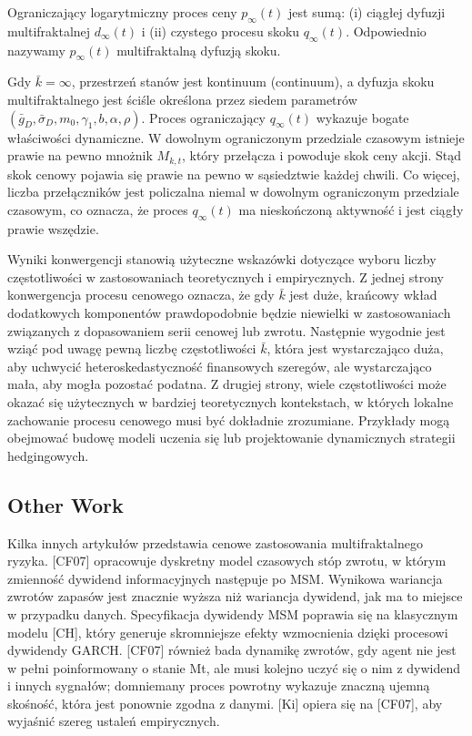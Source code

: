 \documentclass[12pt]{article}
\theoremstyle{definition}
\begin{document}
Ograniczający logarytmiczny proces ceny $p_{\infty} (t)$ jest sumą: (i) ciągłej dyfuzji multifraktalnej $d_{\infty} (t)$ i (ii) czystego procesu skoku $q_{\infty} (t)$. Odpowiednio nazywamy $p_{\infty} (t)$ multifraktalną dyfuzją skoku.

Gdy $\bar{k}= \infty$, przestrzeń stanów jest kontinuum (continuum), a dyfuzja skoku multifraktalnego jest ściśle określona przez siedem parametrów $(\bar{g}_D, \bar{\sigma}_D, m_0, \gamma_1, b, \alpha, \rho)$. Proces ograniczający $q_{\infty} (t)$ wykazuje bogate właściwości dynamiczne. W dowolnym ograniczonym przedziale czasowym istnieje prawie na pewno mnożnik $M_{k, t}$, który przełącza i powoduje skok ceny akcji. Stąd skok cenowy pojawia się prawie na pewno w sąsiedztwie każdej chwili. Co więcej, liczba przełączników jest policzalna niemal w dowolnym ograniczonym przedziale czasowym, co oznacza, że proces $q_{\infty} (t)$ ma nieskończoną aktywność i jest ciągły prawie wszędzie.


Wyniki konwergencji stanowią użyteczne wskazówki dotyczące wyboru liczby częstotliwości w zastosowaniach teoretycznych i empirycznych. Z jednej strony konwergencja procesu cenowego oznacza, że gdy $\bar{k}$ jest duże, krańcowy wkład dodatkowych komponentów prawdopodobnie będzie niewielki w zastosowaniach związanych z dopasowaniem serii cenowej lub zwrotu. Następnie wygodnie jest wziąć pod uwagę pewną liczbę częstotliwości $\bar{k}$, która jest wystarczająco duża, aby uchwycić heteroskedastyczność finansowych szeregów, ale wystarczająco mała, aby mogła pozostać podatna. Z drugiej strony, wiele częstotliwości może okazać się użytecznych w bardziej teoretycznych kontekstach, w których lokalne zachowanie procesu cenowego musi być dokładnie zrozumiane. Przykłady mogą obejmować budowę modeli uczenia się lub projektowanie dynamicznych strategii hedgingowych.

\subsection{Other Work}

Kilka innych artykułów przedstawia cenowe zastosowania multifraktalnego ryzyka. [CF07] opracowuje dyskretny model czasowych stóp zwrotu, w którym zmienność dywidend informacyjnych następuje po MSM. Wynikowa wariancja zwrotów zapasów jest znacznie wyższa niż wariancja dywidend, jak ma to miejsce w przypadku danych. Specyfikacja dywidendy MSM poprawia się na klasycznym modelu [CH], który generuje skromniejsze efekty wzmocnienia dzięki procesowi dywidendy GARCH. [CF07] również bada dynamikę zwrotów, gdy agent nie jest w pełni poinformowany o stanie Mt, ale musi kolejno uczyć się o nim z dywidend i innych sygnałów; domniemany proces powrotny wykazuje znaczną ujemną skośność, która jest ponownie zgodna z danymi. [Ki] opiera się na [CF07], aby wyjaśnić szereg ustaleń empirycznych.
\end{document}
